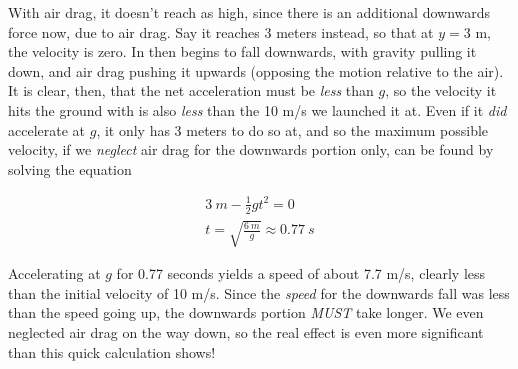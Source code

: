With air drag, it doesn't reach as high, since there is an additional downwards force now, due to air drag. Say it reaches 3 meters instead, so that at $y = 3$ m, the velocity is zero. In then begins to fall downwards, with gravity pulling it down, and air drag pushing it upwards (opposing the motion relative to the air). It is clear, then, that the net acceleration must be \emph{less} than $g$, so the velocity it hits the ground with is also \emph{less} than the 10 m/s we launched it at. Even if it \emph{did} accelerate at $g$, it only has 3 meters to do so at, and so the maximum possible velocity, if we \emph{neglect} air drag for the downwards portion only, can be found by solving the equation

\begin{align}
\SI{3}{m} - \frac{1}{2} g t^2 = 0\\
t = \sqrt{\frac{\SI{6}{m}}{g}} \approx \SI{0.77}{s}
\end{align}

Accelerating at $g$ for 0.77 seconds yields a speed of about 7.7 m/s, clearly less than the initial velocity of 10 m/s. Since the \emph{speed} for the downwards fall was less than the speed going up, the downwards portion \emph{MUST} take longer. We even neglected air drag on the way down, so the real effect is even more significant than this quick calculation shows!

